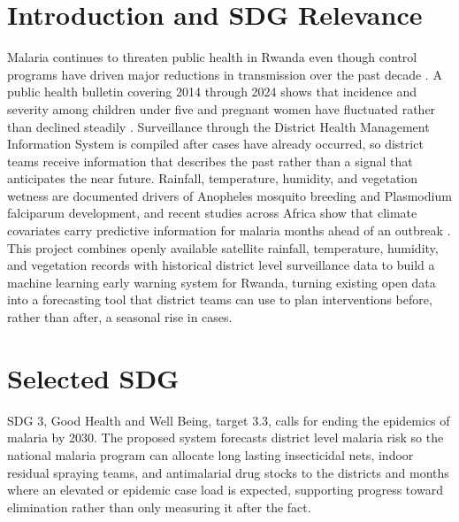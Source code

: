 \documentclass[11pt]{article}
\begin{document}
\section{Introduction and SDG Relevance}
Malaria continues to threaten public health in Rwanda even though control programs have driven major reductions in transmission over the past decade \cite{mohrwanda2019}. A public health bulletin covering 2014 through 2024 shows that incidence and severity among children under five and pregnant women have fluctuated rather than declined steadily \cite{rbc2024}. Surveillance through the District Health Management Information System is compiled after cases have already occurred, so district teams receive information that describes the past rather than a signal that anticipates the near future. Rainfall, temperature, humidity, and vegetation wetness are documented drivers of Anopheles mosquito breeding and Plasmodium falciparum development, and recent studies across Africa show that climate covariates carry predictive information for malaria months ahead of an outbreak \cite{martineau2022,nkiruka2021,khan2024}. This project combines openly available satellite rainfall, temperature, humidity, and vegetation records with historical district level surveillance data to build a machine learning early warning system for Rwanda, turning existing open data into a forecasting tool that district teams can use to plan interventions before, rather than after, a seasonal rise in cases.

\section{Selected SDG}
SDG 3, Good Health and Well Being, target 3.3, calls for ending the epidemics of malaria by 2030. The proposed system forecasts district level malaria risk so the national malaria program can allocate long lasting insecticidal nets, indoor residual spraying teams, and antimalarial drug stocks to the districts and months where an elevated or epidemic case load is expected, supporting progress toward elimination rather than only measuring it after the fact.
\end{document}
